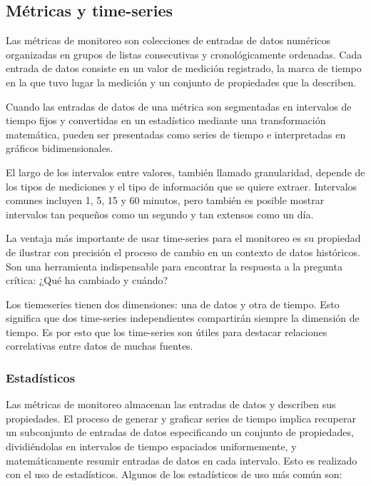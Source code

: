 \subsection{Métricas y time-series}
\label{metricas_y_timeseries}
Las métricas de monitoreo son colecciones de entradas de datos numéricos organizadas en grupos de listas consecutivas y cronológicamente ordenadas. Cada entrada de datos consiste en un valor de medición registrado, la marca de tiempo en la que tuvo lugar la medición y un conjunto de propiedades que la describen.

Cuando las entradas de datos de una métrica son segmentadas en intervalos de tiempo fijos y convertidas en un estadístico mediante una transformación matemática, pueden ser presentadas como series de tiempo e interpretadas en gráficos bidimensionales.

El largo de los intervalos entre valores, también llamado granularidad, depende de los tipos de mediciones y el tipo de información que se quiere extraer. Intervalos comunes incluyen 1, 5, 15 y 60 minutos, pero también es posible mostrar intervalos tan pequeños como un segundo y tan extensos como un día.

La ventaja más importante de usar time-series para el monitoreo es su propiedad de ilustrar con precisión el proceso de cambio en un contexto de datos históricos. Son una herramienta indispensable para encontrar la respuesta a la pregunta crítica: ¿Qué ha cambiado y cuándo?

Los tiemeseries tienen dos dimensiones: una de datos y otra de tiempo. Esto significa que dos time-series independientes compartirán siempre la dimensión de tiempo. Es por esto que los time-series son útiles para destacar relaciones correlativas entre datos de muchas fuentes.

\subsubsection*{Estadísticos}
\label{estadisticos}

Las métricas de monitoreo almacenan las entradas de datos y describen sus propiedades. El proceso de generar y graficar series de tiempo implica recuperar un subconjunto de entradas de datos especificando un conjunto de propiedades, dividiéndolas en intervalos de tiempo espaciados uniformemente, y matemáticamente resumir entradas de datos en cada intervalo. Esto es realizado con el uso de estadísticos. Algunos de los estadísticos de uso más común son:

